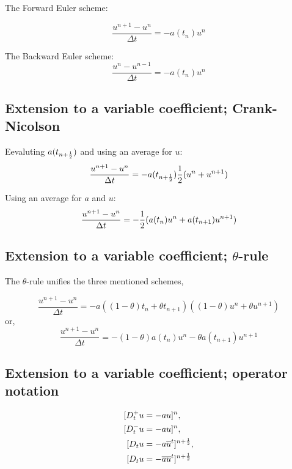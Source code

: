 \documentclass[%
oneside,                 %
final,                   %
10pt]{article}
\begin{document}
The Forward Euler scheme:

\begin{equation}
\frac{u^{n+1} - u^n}{\Delta t} = -a(t_n)u^n
\end{equation}

The Backward Euler scheme:
\begin{equation}
\frac{u^{n} - u^{n-1}}{\Delta t} = -a(t_n)u^n
\end{equation}

\subsection*{Extension to a variable coefficient; Crank-Nicolson}

Eevaluting $a(t_{n+\half})$ and
using an average for $u$:
\begin{equation}
\frac{u^{n+1} - u^{n}}{\Delta t} = -a(t_{n+\half})\half(u^n + u^{n+1})
\end{equation}

Using an average for $a$ and $u$:
\begin{equation}
\frac{u^{n+1} - u^{n}}{\Delta t} = -\half(a(t_n)u^n + a(t_{n+1})u^{n+1})
\end{equation}

\subsection*{Extension to a variable coefficient; $\theta$-rule}

The $\theta$-rule unifies the three mentioned schemes,

\begin{equation}
\frac{u^{n+1} - u^{n}}{\Delta t} = -a((1-\theta)t_n + \theta t_{n+1})((1-\theta) u^n + \theta u^{n+1})
\end{equation}
or,
\begin{equation}
\frac{u^{n+1} - u^{n}}{\Delta t} = -(1-\theta) a(t_n)u^n - \theta
a(t_{n+1})u^{n+1}
\end{equation}

\subsection*{Extension to a variable coefficient; operator notation}

\begin{align*}
\lbrack D^+_t u &= -au\rbrack^n,\\ 
\lbrack D^-_t u &= -au\rbrack^n,\\ 
\lbrack D_t u &= -a\overline{u}^t\rbrack^{n+\half},\\ 
\lbrack D_t u &= -\overline{au}^t\rbrack^{n+\half}\\ 
\end{align*}
\end{document}
